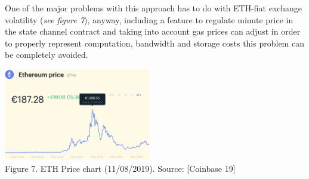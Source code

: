 \documentclass[12pt]{amsart}
\begin{document}
\begin{multicols}{2}
\vspace{0.35cm}

One of the major problems with this approach has to do
with ETH-fiat exchange volatility
(\textit{see figure 7}), anyway, including
a feature to regulate minute price in the state channel
contract and taking into account gas prices can adjust
in order to properly
represent computation, bandwidth and storage costs this
problem can be completely avoided.

\begin{center}
  \includegraphics[keepaspectratio, width=0.481125\textwidth]{images/ethcurrentprice-sourcecoinbase.eps}
\\
Figure 7. ETH Price chart (11/08/2019). Source: [Coinbase 19]
\\
\end{center}



\end{multicols}
\end{document}
